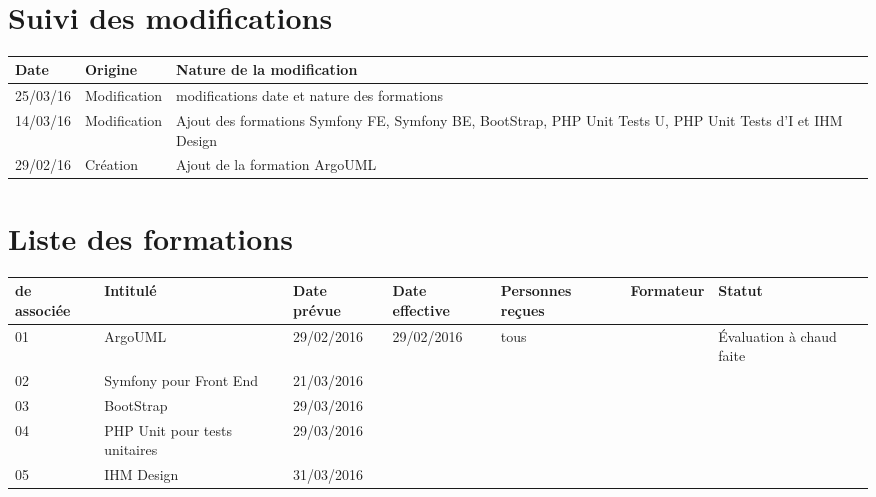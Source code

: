 \documentclass[asi,sansVersion]{picInsa}
\begin{document}
	\begin{center}
		\LARGE
		\textsc{
			\PF{}\\
		}
	\end{center}
	\vspace{0.5cm}

	\section*{Suivi des modifications}
	\begin{table}[H]
		\centering
		\begin{tabularx}{18cm}{|p{1.7cm}|p{4cm}|X|}
		\hline
		\rowcolor[gray]{0.85} Date & Origine & Nature de la modification\\\hline
		25/03/16 & Modification & modifications date et nature des formations \\ \hline
		14/03/16 & Modification & Ajout des formations Symfony FE, Symfony BE, BootStrap, PHP Unit Tests U, PHP Unit Tests d'I et IHM Design \\ \hline
		29/02/16 & Création & Ajout de la formation ArgoUML\\ \hline
		
		\end{tabularx}
	\end{table}
	
	\section*{Liste des formations}
		\begin{longtable}{|p{2cm}|p{3.5cm}|p{2cm}|p{2cm}|p{2cm}|c|p{2cm}|}
			\hline
			\rowcolor{gris2}
			\No{} de \FFCourt{} associée & Intitulé & Date prévue & Date effective & Personnes reçues & Formateur & Statut \\\hline
			01 & ArgoUML & 29/02/2016 & 29/02/2016 & tous & \Julie{} & Évaluation à chaud faite\\\hline
			02 & Symfony pour Front End & 21/03/2016 &  &  &  & \\\hline
			03 & BootStrap & 29/03/2016 &  &  &  & \\\hline
			04 & PHP Unit pour tests unitaires & 29/03/2016 &  &  &  & \\\hline
			05 & IHM Design & 31/03/2016 &  &  &  & \\\hline
		\end{longtable}
\end{document}
